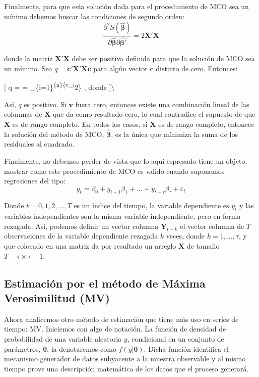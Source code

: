 \documentclass[
  a4paper,
]{article}
\begin{document}
Finalmente, para que esta solución dada para el procedimiento de MCO sea
un mínimo debemos buscar las condiciones de segundo orden: \[
\frac{\partial^2 S(\hat{\boldsymbol \beta})}{\partial \hat{\boldsymbol \beta} \partial \hat{\boldsymbol \beta'}} = 2 \mathbf{X'X}
\]

donde la matriz \(\mathbf{X'X}\) debe ser positiva definida para que la
solución de MCO sea un mínimo. Sea \(q = \mathbf{c'X'Xc}\) para algún
vector \(\mathbf{c}\) distinto de cero. Entonces:

{[} q =  = \sum\_\{i=1\}\textsuperscript{\{n\}\{v\_i}2\}
\textrm{, donde }  {]}\textbackslash{}

Así, \(q\) es positivo. Si \(\mathbf v\) fuera cero, entonces existe una
combinación lineal de las columnas de \(\mathbf X\) que da como
resultado cero, lo cual contradice el supuesto de que \(\mathbf X\) es
de rango completo. En todos los casos, si \(\mathbf X\) es de rango
completo, entonces la solución del método de MCO,
\(\hat{\boldsymbol{\beta}}\), es la única que mínimiza la suma de los
residuales al cuadrado.

Finalmente, no debemos perder de vista que lo aqui espresado tiene un
objeto, mostrar como este procedimiento de MCO es valido cuando
suponemos regresiones del tipo: \[
y_t = \beta_0 + y_{t-1}\beta_1 + \ldots + y_{t-\tau}\beta_\tau + \varepsilon_t
\]

Donde \(t = 0, 1, 2, \ldots, T\) es un índice del tiempo, la variable
dependiente es \(y_t\) y las variables independientes son la misma
variable independiente, pero en forma rezagada. Así, podemos definir un
vector columna \(\mathbf{Y}_{t-k}\) el vector columna de \(T\)
observaciones de la variable dependiente rezagada \(k\) veces, donde
\(k = 1, \ldots, \tau\), y que colocado en una matriz da por resultado
un arreglo \(\mathbf{X}\) de tamaño \(T-\tau \times \tau+1\).

\hypertarget{estimaciuxf3n-por-el-muxe9todo-de-muxe1xima-verosimilitud-mv}{%
\subsection{Estimación por el método de Máxima Verosimilitud
(MV)}\label{estimaciuxf3n-por-el-muxe9todo-de-muxe1xima-verosimilitud-mv}}

Ahora analicemos otro método de estimación que tiene más uso en series
de tiempo: MV. Iniciemos con algo de notación. La función de densidad de
probabilidad de una variable aleatoria \(y\), condicional en un conjunto
de parámetros, \(\boldsymbol{\theta}\), la denotaremos como
\(f(y|\boldsymbol{\theta})\). Dicha función identifica el mecanismo
generador de datos subyacente a la muestra observable y al mismo tiempo
prove una descripción matemática de los datos que el proceso generará.
\end{document}
